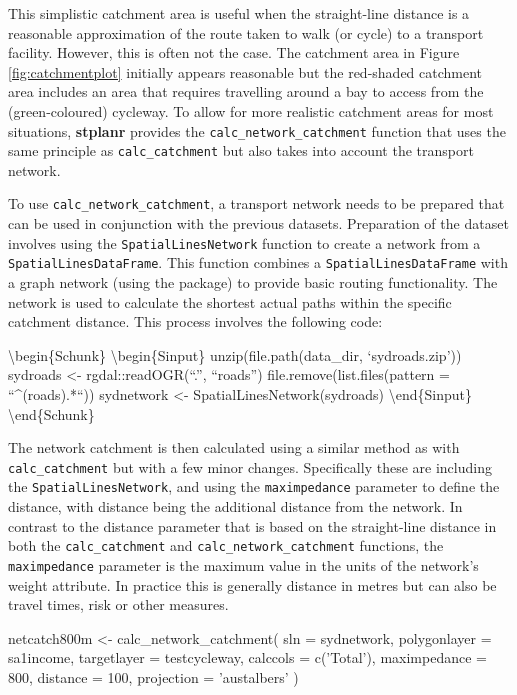 This simplistic catchment area is useful when the straight-line distance
is a reasonable approximation of the route taken to walk (or cycle) to a
transport facility. However, this is often not the case. The catchment
area in Figure \ref{fig:catchmentplot} initially appears reasonable but
the red-shaded catchment area includes an area that requires travelling
around a bay to access from the (green-coloured) cycleway. To allow for
more realistic catchment areas for most situations, \textbf{stplanr}
provides the \texttt{calc\_network\_catchment} function that uses the
same principle as \texttt{calc\_catchment} but also takes into account
the transport network.

To use \texttt{calc\_network\_catchment}, a transport network needs to
be prepared that can be used in conjunction with the previous datasets.
Preparation of the dataset involves using the
\texttt{SpatialLinesNetwork} function to create a network from a
\texttt{SpatialLinesDataFrame}. This function combines a
\texttt{SpatialLinesDataFrame} with a graph network (using the
 package) to provide basic routing functionality. The
network is used to calculate the shortest actual paths within the
specific catchment distance. This process involves the following code:

\textbackslash{}begin\{Schunk\} \textbackslash{}begin\{Sinput\}
unzip(file.path(data\_dir, `sydroads.zip')) sydroads \textless{}-
rgdal::readOGR(``.'', ``roads'') file.remove(list.files(pattern =
``\^{}(roads).*``)) sydnetwork \textless{}-
SpatialLinesNetwork(sydroads) \textbackslash{}end\{Sinput\}
\textbackslash{}end\{Schunk\}

The network catchment is then calculated using a similar method as with
\texttt{calc\_catchment} but with a few minor changes. Specifically
these are including the \texttt{SpatialLinesNetwork}, and using the
\texttt{maximpedance} parameter to define the distance, with distance
being the additional distance from the network. In contrast to the
distance parameter that is based on the straight-line distance in both
the \texttt{calc\_catchment} and \texttt{calc\_network\_catchment}
functions, the \texttt{maximpedance} parameter is the maximum value in
the units of the network's weight attribute. In practice this is
generally distance in metres but can also be travel times, risk or other
measures.

\begin{Schunk}
\begin{Sinput}
netcatch800m <- calc_network_catchment(
  sln = sydnetwork,
  polygonlayer = sa1income,
  targetlayer = testcycleway,
  calccols = c('Total'),
  maximpedance = 800,
  distance = 100,
  projection = 'austalbers'
)
\end{Sinput}
\end{Schunk}

